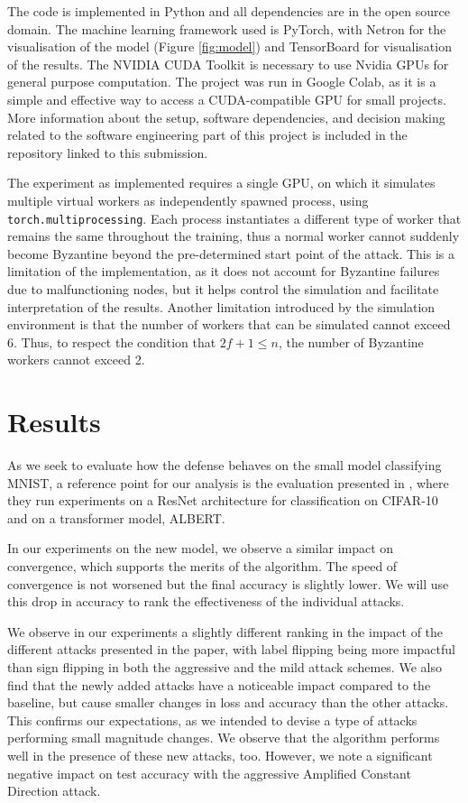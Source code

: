\documentclass{article}
\begin{document}
The code is implemented in Python and all dependencies are in the open source domain. The machine learning framework used is PyTorch, with Netron for the visualisation of the model (Figure \ref{fig:model}) and TensorBoard for visualisation of the results. The NVIDIA CUDA Toolkit is necessary to use Nvidia GPUs for general purpose computation. The project was run in Google Colab, as it is a simple and effective way to access a CUDA-compatible GPU for small projects. More information about the setup, software dependencies, and decision making related to the software engineering part of this project is included in the repository linked to this submission.

The experiment as implemented requires a single GPU, on which it simulates multiple virtual workers as independently spawned process, using \texttt{torch.multiprocessing}. Each process instantiates a different type of worker that remains the same throughout the training, thus a normal worker cannot suddenly become Byzantine beyond the pre-determined start point of the attack. This is a limitation of the implementation, as it does not account for Byzantine failures due to malfunctioning nodes, but it helps control the simulation and facilitate interpretation of the results. Another limitation introduced by the simulation environment is that the number of workers that can be simulated cannot exceed 6. Thus, to respect the condition that $2f + 1 \leq n$, the number of Byzantine workers cannot exceed 2.

\section{Results}
As we seek to evaluate how the defense behaves on the small model classifying MNIST, a reference point for our analysis is the evaluation presented in \cite{gorbunov2021secure}, where they run experiments on a ResNet architecture for classification on CIFAR-10 and on a transformer model, ALBERT. 

In our experiments on the new model, we observe a similar impact on convergence, which supports the merits of the algorithm. The speed of convergence is not worsened but the final accuracy is slightly lower. We will use this drop in accuracy to rank the effectiveness of the individual attacks.

We observe in our experiments a slightly different ranking in the impact of the different attacks presented in the paper, with label flipping being more impactful than sign flipping in both the aggressive and the mild attack schemes. We also find that the newly added attacks have a noticeable impact compared to the baseline, but cause smaller changes in loss and accuracy than the other attacks. This confirms our expectations, as we intended to devise a type of attacks performing small magnitude changes. We observe that the algorithm performs well in the presence of these new attacks, too. However, we note a significant negative impact on test accuracy with the aggressive Amplified Constant Direction attack.
\end{document}
